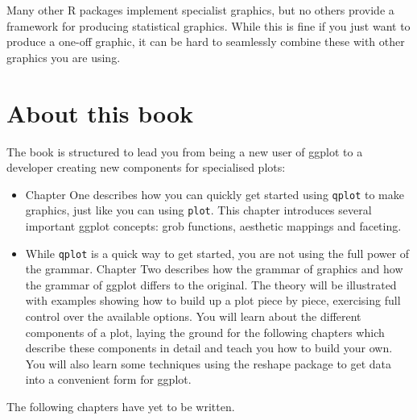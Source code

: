 Many other R packages implement specialist graphics, but no others provide a framework for producing statistical graphics. While this is fine if you just want to produce a one-off graphic, it can be hard to seamlessly combine these with other graphics you are using.

\section{About this book}\label{sec:about_this_book}


The book is structured to lead you from being a new user of ggplot to a developer creating new components for specialised plots:

\begin{itemize}
	\item Chapter One describes how you can quickly get started using {\tt qplot} to make graphics, just like you can using {\tt plot}.  This chapter introduces several important ggplot concepts: grob functions, aesthetic mappings and faceting.
	
	\item While {\tt qplot} is a quick way to get started, you are not using the full power of the grammar.  Chapter Two describes how the grammar of graphics and how the grammar of ggplot differs to the original.  The theory will be illustrated with examples showing how to build up a plot piece by piece, exercising full control over the available options.  You will learn about the different components of a plot, laying the ground for the following chapters which describe these components in detail and teach you how to build your own.  You will also learn some techniques using the reshape package to get data into a convenient form for ggplot.
\end{itemize}

The following chapters have yet to be written.

